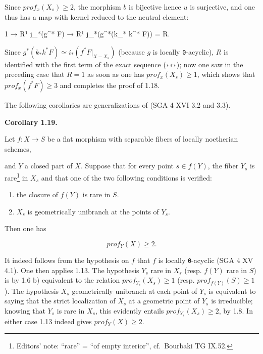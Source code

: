 \documentclass[
  11pt,
  a4paper,
]{book}
\newenvironment{Shaded}{}{}
\newcommand{\NormalTok}[1]{#1}
\begin{document}
Since \(prof_{x}(X_{s}) \geqslant 2\), the morphism \(b\) is bijective
hence \(u\) is surjective, and one thus has a map with kernel reduced to
the neutral element:

\begin{Shaded}
\begin{Highlighting}[]
\NormalTok{1 → R¹ j\_*(g\^{}* F) → R¹ j\_*(g\^{}*(k\_* k\^{}* F)) = R.}
\end{Highlighting}
\end{Shaded}

Since \(g^{*}(k_{*} k^{*} F) \simeq i_{*}(f^{*} F|_{X - X_{s}})\)
(because \(g\) is locally \texttt{0}-acyclic), \(R\) is identified with
the first term of the exact sequence (∗∗∗); now one saw in the preceding
case that \(R = 1\) as soon as one has \(prof_{x}(X_{s}) \geqslant 1\),
which shows that \(prof_{x}(f^{*} F) \geqslant 3\) and completes the
proof of 1.18.

The following corollaries are generalizations of (SGA 4 XVI 3.2 and
3.3).

\textbf{Corollary 1.19.}

Let \(f : X \to S\) be a flat morphism with separable fibers of locally
noetherian schemes,

and \(Y\) a closed part of \(X\). Suppose that for every point
\(s \in f(Y)\), the fiber \(Y_{s}\) is rare\footnote{Editors' note:
  ``rare'' = ``of empty interior'', cf.~Bourbaki TG IX.52.} in \(X_{s}\)
and that one of the two following conditions is verified:

\begin{enumerate}
\def\labelenumi{\alph{enumi})}
\item
  the closure of \(f(Y)\) is rare in \(S\).
\item
  \(X_{s}\) is geometrically unibranch at the points of \(Y_{s}\).
\end{enumerate}

Then one has

\[ prof_{Y}(X) \geqslant 2. \]

It indeed follows from the hypothesis on \(f\) that \(f\) is locally
\texttt{0}-acyclic (SGA 4 XV 4.1). One then applies 1.13. The hypothesis
\(Y_{s}\) rare in \(X_{s}\) (resp. \(f(Y)\) rare in \(S\)) is by 1.6 b)
equivalent to the relation \(prof_{Y_{s}}(X_{s}) \geqslant 1\) (resp.
\(prof_{f(Y)}(S) \geqslant 1\)). The hypothesis \(X_{s}\) geometrically
unibranch at each point of \(Y_{s}\) is equivalent to saying that the
strict localization of \(X_{s}\) at a geometric point of \(Y_{s}\) is
irreducible; knowing that \(Y_{s}\) is rare in \(X_{s}\), this evidently
entails \(prof_{Y_{s}}(X_{s}) \geqslant 2\), by 1.8. In either case 1.13
indeed gives \(prof_{Y}(X) \geqslant 2\).
\end{document}
